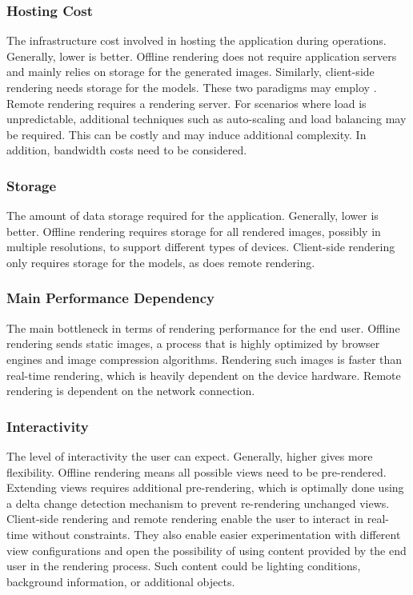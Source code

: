 \subsubsection{Hosting Cost}

The infrastructure cost involved in hosting the application during operations. Generally, lower is better. Offline rendering does not require application servers and mainly relies on storage for the generated images. Similarly, client-side rendering needs storage for the models. These two paradigms may employ . Remote rendering requires a rendering server. For scenarios where load is unpredictable, additional techniques such as auto-scaling and load balancing may be required. This can be costly and may induce additional complexity. In addition, bandwidth costs need to be considered.

\subsubsection{Storage}

The amount of data storage required for the application. Generally, lower is better. Offline rendering requires storage for all rendered images, possibly in multiple resolutions, to support different types of devices. Client-side rendering only requires storage for the models, as does remote rendering.

\subsubsection{Main Performance Dependency}

The main bottleneck in terms of rendering performance for the end user. Offline rendering sends static images, a process that is highly optimized by browser engines and image compression algorithms. Rendering such images is faster than real-time rendering, which is heavily dependent on the device hardware. Remote rendering is dependent on the network connection.

\subsubsection{Interactivity}

The level of interactivity the user can expect. Generally, higher gives more flexibility. Offline rendering means all possible views need to be pre-rendered. Extending views requires additional pre-rendering, which is optimally done using a delta change detection mechanism to prevent re-rendering unchanged views. Client-side rendering and remote rendering enable the user to interact in real-time without constraints. They also enable easier experimentation with different view configurations and open the possibility of using content provided by the end user in the rendering process. Such content could be lighting conditions, background information, or additional objects.

